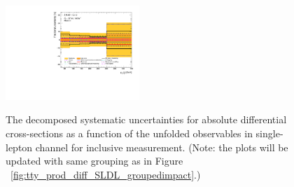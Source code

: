 \begin{figure}[ht]
  \includegraphics[width=0.45\textwidth]{figures/diff_xsec/groupedimpact-absolute-xsec/tty_total_SL/Uncertainty_tty_ptj1.pdf}\\%
\caption{The decomposed systematic uncertainties for absolute differential cross-sections as a function of the unfolded observables in single-lepton channel for inclusive \tty measurement.
 (Note: the plots will be updated with same grouping as in Figure ~\ref{fig:tty_prod_diff_SLDL_groupedimpact}.)}
\label{fig:tty_total_diff_Ljets_groupedimpact}
\end{figure}
\FloatBarrier

